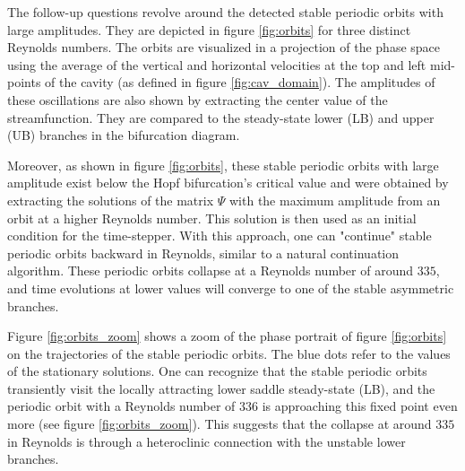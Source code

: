 The follow-up questions revolve around the detected stable periodic orbits with
large amplitudes. They are depicted in figure \ref{fig:orbits} for three
distinct Reynolds numbers. The orbits are visualized in a projection of the
phase space using the average of the vertical and horizontal velocities at the
top and left mid-points of the cavity (as defined in figure
\ref{fig:cav_domain}). The amplitudes of these oscillations are also shown by
extracting the center value of the streamfunction. They are compared to the
steady-state lower (LB) and upper (UB) branches in the bifurcation diagram. 

Moreover, as shown in figure \ref{fig:orbits}, these stable periodic orbits with large
amplitude exist below the Hopf bifurcation's critical value and were obtained
by extracting the solutions of the matrix $\Psi$ with the maximum amplitude
from an orbit at a higher Reynolds number. This solution is then used as an
initial condition for the time-stepper. With this approach, one can "continue" stable
periodic orbits backward in Reynolds, similar to a natural continuation
algorithm. These periodic orbits collapse at a Reynolds number of around $335$,
and time evolutions at lower values will converge to one of the stable
asymmetric branches.

Figure \ref{fig:orbits_zoom} shows a zoom of the phase portrait of figure
\ref{fig:orbits} on the trajectories of the stable periodic orbits. The blue
dots refer to the values of the stationary solutions. One can recognize that
the stable periodic orbits transiently visit the locally attracting lower
saddle steady-state (LB), and the periodic orbit with a Reynolds number of
$336$ is approaching this fixed point even more (see figure
\ref{fig:orbits_zoom}). This suggests that the collapse at around $335$ in
Reynolds is through a heteroclinic connection with the unstable lower branches.

